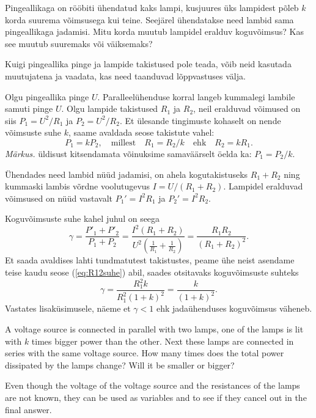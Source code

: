 
Pingeallikaga on rööbiti ühendatud kaks lampi, kusjuures üks lampidest põleb $k$ korda suurema võimsusega kui teine. Seejärel ühendatakse need lambid sama pingeallikaga jadamisi. Mitu korda muutub lampidel eralduv koguvõimsus? Kas see muutub suuremaks või väiksemaks?
\pagebreak

\hint
Kuigi pingeallika pinge ja lampide takistused pole teada, võib neid kasutada muutujatena ja vaadata, kas need taanduvad lõppvastuses välja.

\solu
Olgu pingeallika pinge $U$. Paralleelühenduse korral langeb kummalegi lambile samuti pinge $U$. Olgu lampide takistused $R_1$ ja $R_2$, neil eralduvad võimused on siis $P_1=U^2/R_1$ ja $P_2=U^2/R_2$. Et ülesande tingimuste kohaselt on nende võimsuste suhe $k$, saame avaldada seose takistute vahel:
\begin{equation}
\label{eq:R12suhe}
P_1 = kP_2, \quad \text{millest} \quad R_1 = R_2/k \quad \text{ehk} \quad R_2=kR_1.
\end{equation}
\emph{Märkus.} üldisust kitsendamata võinuksime samaväärselt öelda ka: $P_1 = P_2/k$.

Ühendades need lambid nüüd jadamisi, on ahela kogutakistuseks $R_1+R_2$ ning kummaski lambis võrdne voolutugevus $I=U/(R_1+R_2)$. Lampidel eralduvad võimsused on nüüd vastavalt $P_1'=I^2R_1$ ja $P_2'=I^2R_2$.

Koguvõimsuste suhe kahel juhul on seega
\[
\gamma = \frac{P'_1+P'_2}{P_1+P_2} = \frac{I^2(R_1+R_2)}{U^2(\frac{1}{R_1}+\frac{1}{R_2})}=
\frac{R_1R_2}{(R_1+R_2)^2}.
\]
Et saada avaldises lahti tundmatutest takistustes, peame ühe neist asendame teise kaudu seose (\ref{eq:R12suhe}) abil, saades otsitavaks koguvõimsuste suhteks
\[
\gamma = \frac{R_1^2 k}{R_1^2(1+k)^2} = \frac{k}{(1+k)^2}.
\]
Vastates lisaküsimusele, näeme et $\gamma < 1$ ehk jadaühenduses koguvõimsus väheneb.

A voltage source is connected in parallel with two lamps, one of the lamps is lit with $k$ times bigger power than the other. Next these lamps are connected in series with the same voltage source. How many times does the total power dissipated by the lamps change? Will it be smaller or bigger?

\hinteng
Even though the voltage of the voltage source and the resistances of the lamps are not known, they can be used as variables and to see if they cancel out in the final answer.

